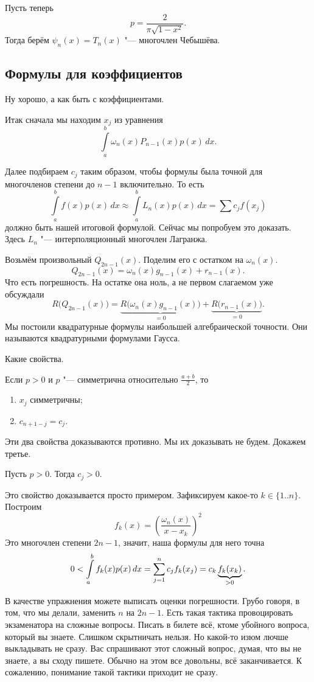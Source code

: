 Пусть теперь
\[
  p = \frac{2}{\pi\sqrt{1-x^2}}.
\]
Тогда берём $\psi_n(x) = T_n(x)$ "--- многочлен Чебышёва.
\subsection{Формулы для коэффициентов}
Ну хорошо, а как быть с коэффициентами.

Итак сначала мы находим $x_j$ из уравнения
\[
  \int\limits_a^b \omega_n(x) P_{n-1}(x) p(x)\,dx.
\]

Далее подбираем $c_j$ таким образом, чтобы формулы была точной для многочленов степени до $n-1$ включительно. То есть
\[
  \int\limits_a^b f(x) p(x)\,dx\approx \int\limits_a^b L_n(x) p(x)\,dx = \sum c_j f(x_j)
\]
должно быть нашей итоговой формулой. Сейчас мы попробуем это доказать. Здесь $L_n$ "--- интерполяционный многочлен Лагранжа.

Возьмём произвольный $Q_{2n-1}(x)$. Поделим его с остатком на $\omega_n(x)$.
\[
  Q_{2n-1}(x) = \omega_n(x) g_{n-1}(x) + r_{n-1}(x).
\]
Что есть погрешность. На остатке она ноль, а не первом слагаемом уже обсуждали
\[
  R\big(Q_{2n-1}(x)\big) = \underbrace{R\big(\omega_n(x) g_{n-1}(x)\big)}_{=0}  + \underbrace{R\big(r_{n-1}(x)\big)}_{=0}.
\]
Мы постоили квадратурные формулы наибольшей алгебраической точности. Они называются квадратурными формулами Гаусса.


Какие свойства.
\begin{Ut}
  Если $p>0$ и $p$ "--- симметрична относительно $\frac{a+b}{2}$, то
\begin{enumerate}
\item $x_j$ симметричны;
\item $c_{n+1-j} = c_j$.
\end{enumerate}
\end{Ut}
Эти два свойства доказываются противно. Мы их доказывать не будем. Докажем третье.
\begin{Ut}
  Пусть $p>0$. Тогда $c_j>0$.
\end{Ut}
\begin{Proof}
Это свойство доказывается просто примером. Зафиксируем какое-то $k\in\{1..n\}$. Построим 
\[
f_k(x) = \left( \frac{\omega_n(x)}{x-x_k} \right)^2
\]
Это многочлен степени $2n-1$, значит, наша формулы для него точна
\[
  0< \int\limits_a^b f_k(x)p(x)\,dx = \sum\limits_{j = 1}^{n} c_j f_k(x_j) = c_k \underbrace{f_k(x_k)}_{>0}.
\] 
\end{Proof}

В качестве упражнения можете выписать оценки погрешности. Грубо говоря, в том, что мы делали, заменить $n$ на $2n-1$.
Есть такая тактика провоцировать экзаменатора на сложные вопросы. Писать в билете всё, ктоме убойного вопроса, который вы знаете. Слишком скрытничать нельзя. Но какой-то изюм лючше выкладывать не сразу. Вас спрашивают этот сложный вопрос, думая, что вы не знаете, а вы сходу пишете. Обычно на этом все довольны, всё заканчивается. К сожалению, понимание такой тактики приходит не сразу.

